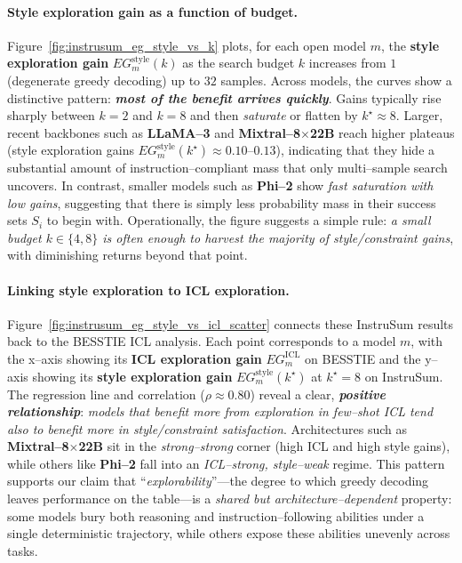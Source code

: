 \paragraph{Style exploration gain as a function of budget.}
Figure~\ref{fig:instrusum_eg_style_vs_k} plots, for each open model $m$,
the \textbf{style exploration gain} $EG^{\text{style}}_m(k)$ as the
search budget $k$ increases from $1$ (degenerate greedy decoding) up to
$32$ samples. Across models, the curves show a distinctive pattern:
\emph{\textbf{most of the benefit arrives quickly}}. Gains typically
rise sharply between $k{=}2$ and $k{=}8$ and then \emph{saturate} or
flatten by $k^\star{\approx}8$. Larger, recent backbones such as
\textbf{LLaMA--3} and \textbf{Mixtral--8$\times$22B} reach higher
plateaus (style exploration gains
$EG^{\text{style}}_m(k^\star)\!\approx\!0.10$--$0.13$), indicating that
they hide a substantial amount of instruction--compliant mass that only
multi--sample search uncovers. In contrast, smaller models such as
\textbf{Phi--2} show \emph{fast saturation with low gains}, suggesting
that there is simply less probability mass in their success sets $S_i$
to begin with. Operationally, the figure suggests a simple rule:
\emph{a small budget $k \in \{4,8\}$ is often enough to harvest the
majority of style/constraint gains}, with diminishing returns beyond
that point.

\paragraph{Linking style exploration to ICL exploration.}
Figure~\ref{fig:instrusum_eg_style_vs_icl_scatter} connects these
InstruSum results back to the BESSTIE ICL analysis. Each point
corresponds to a model $m$, with the x--axis showing its
\textbf{ICL exploration gain} $EG^{\text{ICL}}_m$ on BESSTIE and the
y--axis showing its \textbf{style exploration gain}
$EG^{\text{style}}_m(k^\star)$ at $k^\star{=}8$ on InstruSum. The
regression line and correlation ($\rho{\approx}0.80$) reveal a clear,
\emph{\textbf{positive relationship}}: \emph{models that benefit more
from exploration in few--shot ICL tend also to benefit more in
style/constraint satisfaction}. Architectures such as
\textbf{Mixtral--8$\times$22B} sit in the \emph{strong--strong} corner
(high ICL and high style gains), while others like \textbf{Phi--2} fall
into an \emph{ICL--strong, style--weak} regime. This pattern supports
our claim that ``\emph{explorability}''---the degree to which greedy
decoding leaves performance on the table---is a \emph{shared but
architecture--dependent} property: some models bury both reasoning and
instruction--following abilities under a single deterministic trajectory,
while others expose these abilities unevenly across tasks.

